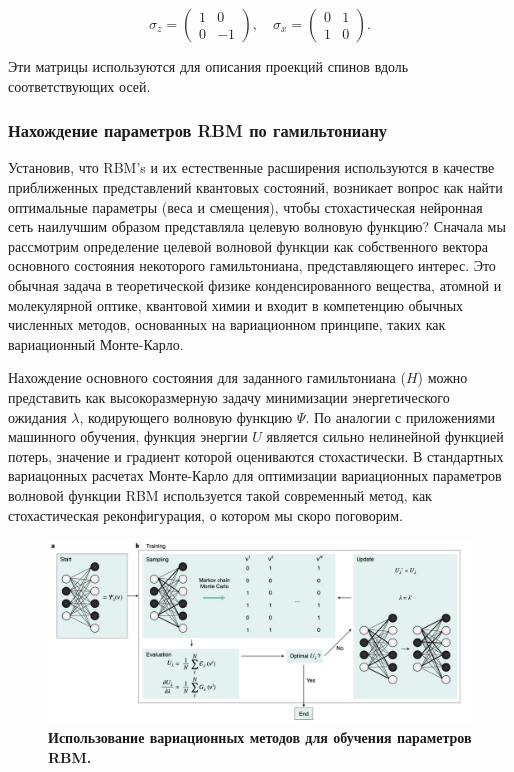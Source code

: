 \[
\sigma_z = \begin{pmatrix}
1 & 0 \\
0 & -1
\end{pmatrix}, \quad \sigma_x = \begin{pmatrix}
0 & 1 \\
1 & 0
\end{pmatrix}.
\]

Эти матрицы используются для описания проекций спинов вдоль соответствующих осей.



\subsubsection{Нахождение параметров RBM по гамильтониану}

    Установив, что RBM's и их естественные расширения используются в качестве приближенных представлений квантовых состояний, возникает вопрос как найти оптимальные параметры (веса и смещения), чтобы стохастическая нейронная сеть наилучшим образом представляла целевую волновую функцию? Сначала мы рассмотрим определение целевой волновой функции как собственного вектора основного состояния некоторого гамильтониана, представляющего интерес. Это обычная задача в теоретической физике конденсированного вещества, атомной и молекулярной оптике, квантовой химии и входит в компетенцию обычных численных методов, основанных на вариационном принципе, таких как вариационный Монте-Карло.
    
    Нахождение основного состояния для заданного гамильтониана ($H$) можно представить как высокоразмерную задачу минимизации энергетического ожидания $\lambda$, кодирующего волновую функцию $\Psi$. По аналогии с приложениями машинного обучения, функция энергии $U$ является сильно нелинейной функцией потерь, значение и градиент которой оцениваются стохастически. В стандартных вариацонных расчетах Монте-Карло для оптимизации вариационных параметров волновой функции RBM используется такой современный метод, как стохастическая реконфигурация, о котором мы скоро поговорим.

    
    \begin{figure}[H]
        \centering
        \includegraphics[width=0.9\linewidth]{Images/image6.png}
        \caption{\textbf{Использование вариационных методов для обучения параметров RBM.}}
        \label{fig:ваш_ярлык}
    \end{figure}
    
